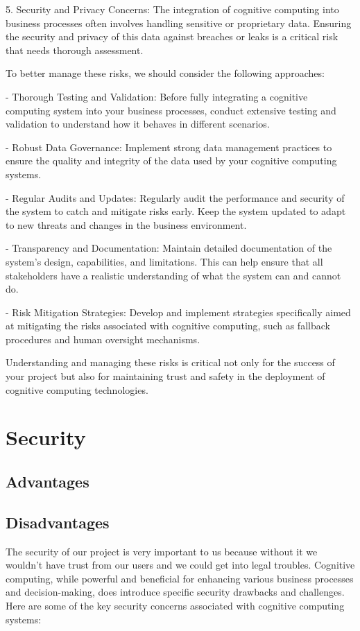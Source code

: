 \documentclass{article}
\begin{document}
5. Security and Privacy Concerns: The integration of cognitive computing into business processes often involves handling sensitive or proprietary data. Ensuring the security and privacy of this data against breaches or leaks is a critical risk that needs thorough assessment.

To better manage these risks, we should consider the following approaches:

- Thorough Testing and Validation: Before fully integrating a cognitive computing system into your business processes, conduct extensive testing and validation to understand how it behaves in different scenarios.
  
  - Robust Data Governance: Implement strong data management practices to ensure the quality and integrity of the data used by your cognitive computing systems.

  - Regular Audits and Updates: Regularly audit the performance and security of the system to catch and mitigate risks early. Keep the system updated to adapt to new threats and changes in the business environment.

  - Transparency and Documentation: Maintain detailed documentation of the system's design, capabilities, and limitations. This can help ensure that all stakeholders have a realistic understanding of what the system can and cannot do.

  - Risk Mitigation Strategies: Develop and implement strategies specifically aimed at mitigating the risks associated with cognitive computing, such as fallback procedures and human oversight mechanisms.

  Understanding and managing these risks is critical not only for the success of your project but also for maintaining trust and safety in the deployment of cognitive computing technologies.

\section{Security}
\subsection{Advantages}

\subsection{Disadvantages}

The security of our project is very important to us because without it we wouldn't have  trust from our users and we could get into legal troubles.
Cognitive computing, while powerful and beneficial for enhancing various business processes and decision-making, does introduce specific security drawbacks and challenges. Here are some of the key security concerns associated with cognitive computing systems:
\end{document}

